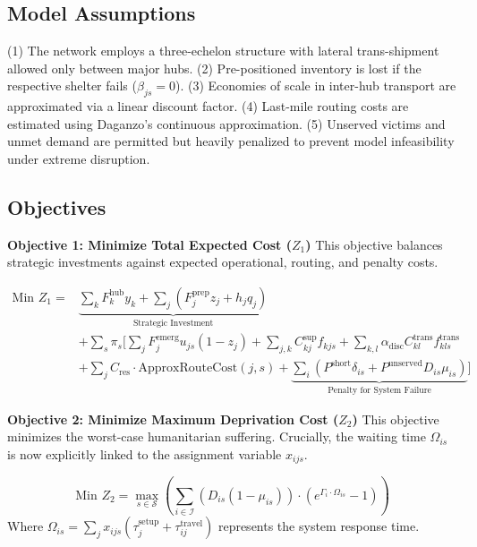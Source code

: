 \subsection{Model Assumptions}
(1) The network employs a three-echelon structure with lateral trans-shipment allowed only between major hubs.
(2) Pre-positioned inventory is lost if the respective shelter fails ($\beta_{js}=0$).
(3) Economies of scale in inter-hub transport are approximated via a linear discount factor.
(4) Last-mile routing costs are estimated using Daganzo's continuous approximation.
(5) Unserved victims and unmet demand are permitted but heavily penalized to prevent model infeasibility under extreme disruption.

\subsection{Objectives}

\textbf{Objective 1: Minimize Total Expected Cost ($Z_1$)}
This objective balances strategic investments against expected operational, routing, and penalty costs.

\begin{equation} \label{eq:obj1}
\begin{aligned}
    \text{Min } Z_1 = & \underbrace{\sum_{k} F_k^{\text{hub}} y_k + \sum_{j} (F_j^{\text{prep}} z_j + h_j q_j)}_{\text{Strategic Investment}} \\
    & + \sum_{s} \pi_s \Bigg[ \sum_{j} F_j^{\text{emerg}} u_{js}(1 - z_j) 
    + \sum_{j,k} C_{kj}^{\text{sup}} f_{kjs} 
    + \sum_{k,l} \alpha_{\text{disc}} C_{kl}^{\text{trans}} f_{kls}^{\text{trans}} \\
    & + \sum_{j} C_{\text{res}} \cdot \text{ApproxRouteCost}(j,s) 
    + \underbrace{\sum_{i} (P^{\text{short}} \delta_{is} + P^{\text{unserved}} D_{is} \mu_{is})}_{\text{Penalty for System Failure}} \Bigg]
\end{aligned}
\end{equation}

\textbf{Objective 2: Minimize Maximum Deprivation Cost ($Z_2$)}
This objective minimizes the worst-case humanitarian suffering. Crucially, the waiting time $\Omega_{is}$ is now explicitly linked to the assignment variable $x_{ijs}$.

\begin{equation} \label{eq:obj2}
    \text{Min } Z_2 = \max_{s \in \mathcal{S}} \left( \sum_{i \in \mathcal{I}} (D_{is} (1-\mu_{is})) \cdot \left( e^{\Gamma_i \cdot \Omega_{is}} - 1 \right) \right)
\end{equation}
\noindent Where $\Omega_{is} = \sum_{j} x_{ijs} (\tau_{j}^{\text{setup}} + \tau_{ij}^{\text{travel}})$ represents the system response time.

